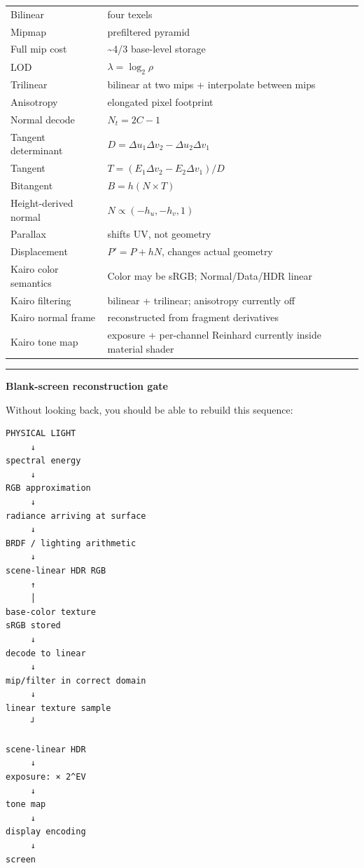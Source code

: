 {\begin{longtable}[]{@{}
  >{\raggedright\arraybackslash}p{}
  >{\raggedright\arraybackslash}p{}@{}}
Bilinear & four texels \\
Mipmap & prefiltered pyramid \\
Full mip cost & \textasciitilde4/3 base-level storage \\
LOD & \(\lambda=\log_2\rho\) \\
Trilinear & bilinear at two mips + interpolate between mips \\
Anisotropy & elongated pixel footprint \\
Normal decode & \(N_t=2C-1\) \\
Tangent determinant & \(D=\Delta u_1\Delta v_2-\Delta u_2\Delta v_1\) \\
Tangent & \(T=(E_1\Delta v_2-E_2\Delta v_1)/D\) \\
Bitangent & \(B=h(N\times T)\) \\
Height-derived normal & \(N\propto(-h_u,-h_v,1)\) \\
Parallax & shifts UV, not geometry \\
Displacement & \(P'=P+hN\), changes actual geometry \\
Kairo color semantics & Color may be sRGB; Normal/Data/HDR linear \\
Kairo filtering & bilinear + trilinear; anisotropy currently off \\
Kairo normal frame & reconstructed from fragment derivatives \\
Kairo tone map & exposure + per-channel Reinhard currently inside material shader \\
\end{longtable}
}

\begin{center}\rule{0.5\linewidth}{0.5pt}\end{center}

\textbf{Blank-screen reconstruction gate}

Without looking back, you should be able to rebuild this sequence:

\begin{verbatim}
PHYSICAL LIGHT
     ↓
spectral energy
     ↓
RGB approximation
     ↓
radiance arriving at surface
     ↓
BRDF / lighting arithmetic
     ↓
scene-linear HDR RGB
     ↑
     │
base-color texture
sRGB stored
     ↓
decode to linear
     ↓
mip/filter in correct domain
     ↓
linear texture sample
     ┘

scene-linear HDR
     ↓
exposure: × 2^EV
     ↓
tone map
     ↓
display encoding
     ↓
screen
\end{verbatim}

